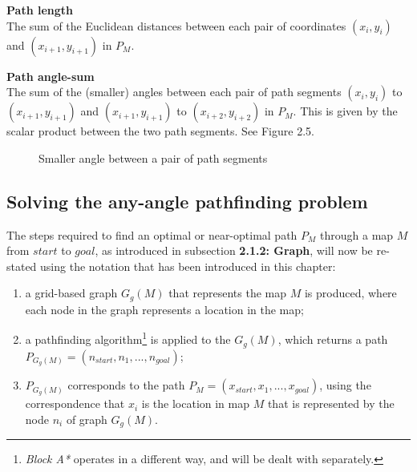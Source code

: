 \documentclass[12pt,notitlepage]{report}
\begin{document}
\begin{description}
\item{\bfseries Path length}\\
The sum of the Euclidean distances between each pair of coordinates $(x_{i},y_{i})$ and $(x_{i+1},y_{i+1})$ in $P_{M}$.
\item{\bfseries Path angle-sum}\\
The sum of the (smaller) angles between each pair of path segments $(x_{i},y_{i})$ to $(x_{i+1},y_{i+1})$ and $(x_{i+1},y_{i+1})$ to $(x_{i+2},y_{i+2})$ in $P_{M}$. This is given by the scalar product between the two path segments. See Figure 2.5.
\end{description}

\begin{figure}
   \centering
    \caption{Smaller angle between a pair of path segments}
  \end{figure}


\subsection{Solving the any-angle pathfinding problem}

\noindent
The steps required to find an optimal or near-optimal path $P_{M}$ through a map $M$ from $start$ to $goal$, as introduced in subsection {\bfseries 2.1.2: Graph}, will now be re-stated using the notation that has been introduced in this chapter:
\begin{enumerate}
\item a grid-based graph $G_{g}(M)$ that represents the map $M$ is produced, where each node in the graph represents a location in the map; 
\item a pathfinding algorithm\footnote{{\em Block A*} operates in a different way, and will be dealt with separately.} is applied to the $G_{g}(M)$, which returns a path $P_{G_{g}(M)} = (n_{start},n_{1},...,n_{goal})$;
\item $P_{G_{g}(M)}$ corresponds to the path $P_{M} = (x_{start},x_{1},...,x_{goal})$, using the correspondence that $x_{i}$ is the location in map $M$ that is represented by the node $n_{i}$ of graph $G_{g}(M)$.
\end{enumerate}
\end{document}

